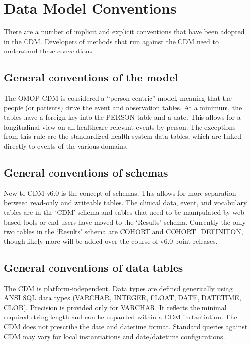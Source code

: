 \documentclass[]{book}
\begin{document}
\section{Data Model Conventions}\label{data-model-conventions}

There are a number of implicit and explicit conventions that have been
adopted in the CDM. Developers of methods that run against the CDM need
to understand these conventions.

\subsection{General conventions of the
model}\label{general-conventions-of-the-model}

The OMOP CDM is considered a ``person-centric'' model, meaning that the
people (or patients) drive the event and observation tables. At a
minimum, the tables have a foreign key into the PERSON table and a date.
This allows for a longitudinal view on all healthcare-relevant events by
person. The exceptions from this rule are the standardized health system
data tables, which are linked directly to events of the various domains.

\subsection{General conventions of
schemas}\label{general-conventions-of-schemas}

New to CDM v6.0 is the concept of schemas. This allows for more
separation between read-only and writeable tables. The clinical data,
event, and vocabulary tables are in the `CDM' schema and tables that
need to be manipulated by web-based tools or end users have moved to the
`Results' schema. Currently the only two tables in the `Results' schema
are COHORT and COHORT\_DEFINITON, though likely more will be added over
the course of v6.0 point releases.

\subsection{General conventions of data
tables}\label{general-conventions-of-data-tables}

The CDM is platform-independent. Data types are defined generically
using ANSI SQL data types (VARCHAR, INTEGER, FLOAT, DATE, DATETIME,
CLOB). Precision is provided only for VARCHAR. It reflects the minimal
required string length and can be expanded within a CDM instantiation.
The CDM does not prescribe the date and datetime format. Standard
queries against CDM may vary for local instantiations and date/datetime
configurations.
\end{document}
